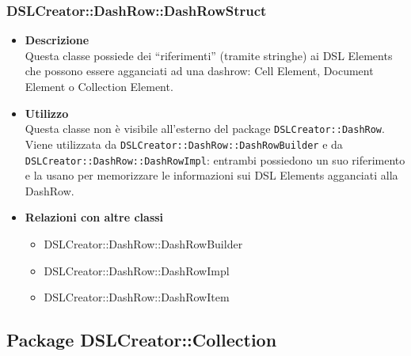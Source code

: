 \subsubsection{DSLCreator::DashRow::DashRowStruct}
                    \begin{itemize}
                        \item \textbf{Descrizione} \hfill \\
                            Questa classe possiede dei ``riferimenti'' (tramite stringhe) ai DSL Elements che possono essere agganciati ad una dashrow: Cell Element, Document Element o Collection Element.
                        \item \textbf{Utilizzo} \hfill \\
                            Questa classe non è visibile all'esterno del package \texttt{DSLCreator::DashRow}. Viene utilizzata da \texttt{DSLCreator::DashRow::DashRowBuilder} e da \texttt{DSLCreator::Dash\-Row::DashRowImpl}: entrambi possiedono un suo riferimento e la usano per memorizzare le informazioni sui DSL Elements agganciati alla DashRow.
                        \item \textbf{Relazioni con altre classi}
                            \begin{itemize}
                              \item DSLCreator::DashRow::DashRowBuilder
                              \item DSLCreator::DashRow::DashRowImpl
                              \item DSLCreator::DashRow::DashRowItem
                            \end{itemize}
                    \end{itemize}

\subsection{Package DSLCreator::Collection}
